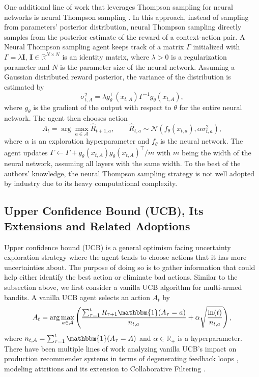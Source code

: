 One additional line of work that leverages Thompson sampling for neural networks is neural Thompson sampling \cite{zhang2021neural}. In this approach, instead of sampling from parameters' posterior distribution, neural Thompson sampling directly samples from the posterior estimate of the reward of a context-action pair. A Neural Thompson sampling agent keeps track of a matrix $\Gamma$ initialized with $\Gamma = \lambda \mathbf{I}$, $\mathbf{I} \in \mathbb{R}^{N \times N}$ is an identity matrix, where $\lambda > 0$ is a regularization parameter and $N$ is the parameter size of the neural network. Assuming a Gaussian distributed reward posterior, the variance of the distribution is estimated by
\begin{equation}
    \sigma^2_{t, A} = \lambda g_{\theta}^{\top}(x_{t, A})\Gamma^{-1}g_{\theta}(x_{t, A}),
\end{equation}
where $g_\theta$ is the gradient of the output with respect to $\theta$ for the entire neural network. The agent then chooses action
\begin{equation}
    A_t = \arg\max_{a \in \mathcal{A}}\hat{R}_{t+1, a}, \qquad \hat{R}_{t, a} \sim \mathcal{N}(f_{\theta}(x_{t, a}), \alpha \sigma^2_{t, a}),
\end{equation}
where $\alpha$ is an exploration hyperparameter and $f_{\theta}$ is the neural network. The agent updates $\Gamma \leftarrow \Gamma + g_{\theta}(x_{t, A})g_{\theta}(x_{t, A})^\top / m$ with $m$ being the width of the neural network, assuming all layers with the same width. To the best of the authors' knowledge, the neural Thompson sampling strategy is not well adopted by industry due to its heavy computational complexity. 

\subsection{Upper Confidence Bound (UCB), Its Extensions and Related Adoptions}
Upper confidence bound (UCB) is a general optimism facing uncertainty exploration strategy where the agent tends to choose actions that it has more uncertainties about. The purpose of doing so is to gather information that could help either identify the best action or eliminate bad actions. Similar to the subsection above, we first consider a vanilla UCB algorithm \cite{agrawal1995sample, auer2002finite} for multi-armed bandits. A vanilla UCB agent selects an action $A_t$ by 
\begin{equation}
    A_t = \arg\max_{a \in \mathcal{A}} \left(\frac{\sum_{\tau=1}^{t} R_{\tau+1} \mathbbm{1}(A_\tau = a)}{n_{t, a}} + \alpha\sqrt{\frac{\ln(t)}{n_{t, a}}}\right),
\end{equation}
where $n_{t, A} = \sum_{\tau = 1}^t \mathbbm{1}(A_\tau = A)$ and $\alpha \in \mathbb{R_+}$ is a hyperparameter. There have been multiple lines of work analyzing vanilla UCB's impact on production recommender systems in terms of degenerating feedback loops \cite{jiang2019degenerate, Guo2023evaluate}, modeling attritions \cite{ben2022modeling} and its extension to Collaborative Filtering \cite{nakamura2015ucb}.

